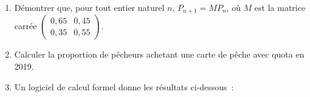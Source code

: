 \begin{enumerate}
     \item Démontrer que, pour tout entier naturel $n$, $P_{n+1}=MP_n$, où $M$ est la matrice carrée $\begin{pmatrix}
          0,65&0,45\\
          0,35&0,55
     \end{pmatrix}$.
     \item Calculer la proportion de pêcheurs achetant une carte de pêche avec quota en 2019.
     \item Un logiciel de calcul formel donne les résultats ci-dessous~:
     \begin{center}
\end{center}
\end{enumerate}
